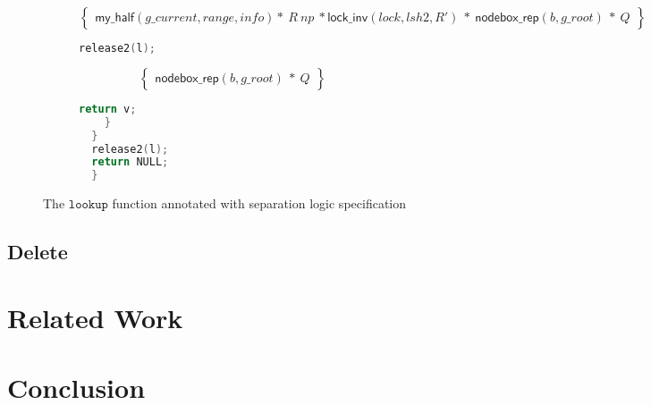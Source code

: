 \documentclass[acmsmall,screen]{acmart}\settopmatter{printfolios=true}
\begin{document}
\begin{figure}[htp]
\begin{subfigure}[t]{1\textwidth}
$$\left\{\begin{array}{l} \mathsf{my\_half}(g\_current,range,info)*\ R\ np\ *\mathsf{lock\_inv}(lock,lsh2,R')\ *\ \mathsf{nodebox\_rep}(b,g\_root)\ *\ Q\end{array}\right\}$$
 \vspace*{-10pt}
        \begin{lstlisting}[language = C]
      release2(l);
         \end{lstlisting}
       $$\left\{\begin{array}{l} \mathsf{nodebox\_rep}(b,g\_root)\ *\ Q\end{array}\right\}$$
        \vspace*{-10pt}
         \begin{lstlisting}[language = C]
       return v;
    }
  }
  release2(l);
  return NULL;
  }
 \end{lstlisting} 
\end{subfigure}
\caption{The $\texttt{lookup}$ function annotated with separation logic specification}
\label{lookupproof}
\end{figure} 

\subsection{Delete}

\section{Related Work}
\section{Conclusion}


\end{document}
